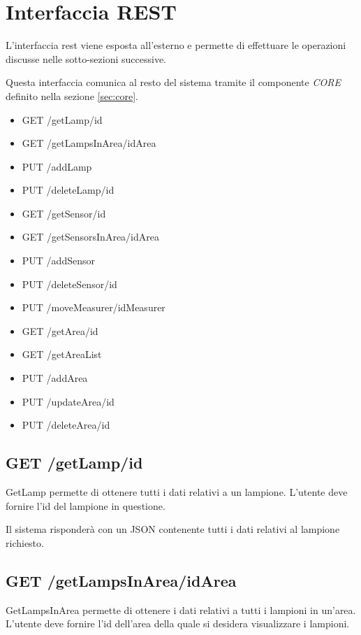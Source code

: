 \section{Interfaccia REST}

L'interfaccia rest viene esposta all'esterno e permette di effettuare le operazioni discusse nelle sotto-sezioni successive.

Questa interfaccia comunica al resto del sistema tramite il componente \textit{CORE} definito nella sezione \ref{sec:core}.

\begin{itemize}
    \item GET /getLamp/id
    \item GET /getLampsInArea/idArea
    \item PUT /addLamp
    \item PUT /deleteLamp/id
    \item GET /getSensor/id
    \item GET /getSensorsInArea/idArea
    \item PUT /addSensor
    \item PUT /deleteSensor/id
    \item PUT /moveMeasurer/idMeasurer
    \item GET /getArea/id
    \item GET /getAreaList
    \item PUT /addArea
    \item PUT /updateArea/id
    \item PUT /deleteArea/id
\end{itemize}

\subsection{ GET /getLamp/id}

GetLamp permette di ottenere tutti i dati relativi a un lampione. L'utente deve fornire l'id del lampione in questione.

Il sistema risponderà con un JSON contenente tutti i dati relativi al lampione richiesto.

\subsection{ GET /getLampsInArea/idArea}

GetLampsInArea permette di ottenere i dati relativi a tutti i lampioni in un'area. L'utente deve fornire l'id dell'area della quale si desidera visualizzare i lampioni.

